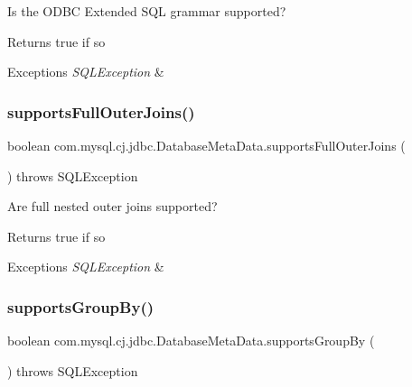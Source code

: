 Is the O\+D\+BC Extended S\+QL grammar supported?

\begin{DoxyReturn}{Returns}
true if so 
\end{DoxyReturn}

\begin{DoxyExceptions}{Exceptions}
{\em S\+Q\+L\+Exception} & \\
\hline
\end{DoxyExceptions}
\mbox{\label{classcom_1_1mysql_1_1cj_1_1jdbc_1_1_database_meta_data_a50a0b715db01fb28b8de35d3a01cc5d4}} 
\subsubsection{\texorpdfstring{supports\+Full\+Outer\+Joins()}{supportsFullOuterJoins()}}
{\footnotesize\ttfamily boolean com.\+mysql.\+cj.\+jdbc.\+Database\+Meta\+Data.\+supports\+Full\+Outer\+Joins (\begin{DoxyParamCaption}{ }\end{DoxyParamCaption}) throws S\+Q\+L\+Exception}

Are full nested outer joins supported?

\begin{DoxyReturn}{Returns}
true if so 
\end{DoxyReturn}

\begin{DoxyExceptions}{Exceptions}
{\em S\+Q\+L\+Exception} & \\
\hline
\end{DoxyExceptions}
\mbox{\label{classcom_1_1mysql_1_1cj_1_1jdbc_1_1_database_meta_data_a3afb86e4ce9852aaf9683f6d1e9909d4}} 
\subsubsection{\texorpdfstring{supports\+Group\+By()}{supportsGroupBy()}}
{\footnotesize\ttfamily boolean com.\+mysql.\+cj.\+jdbc.\+Database\+Meta\+Data.\+supports\+Group\+By (\begin{DoxyParamCaption}{ }\end{DoxyParamCaption}) throws S\+Q\+L\+Exception}

